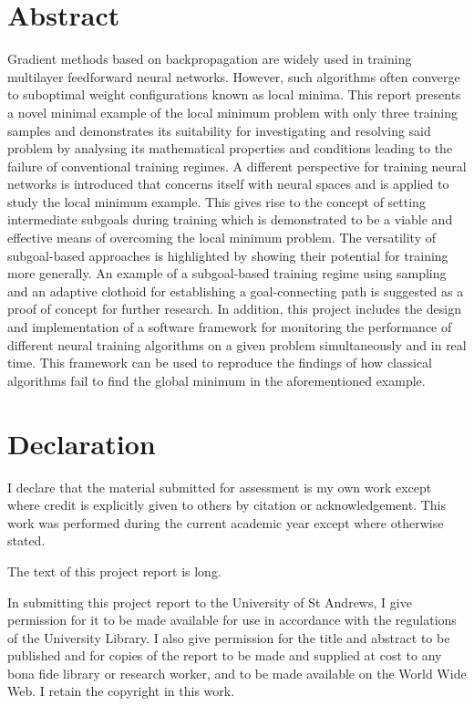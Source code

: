 \chapter*{Abstract}
Gradient methods based on backpropagation are widely used in training multilayer feedforward neural networks. 
However, such algorithms often converge to suboptimal weight configurations known as local minima. 
This report presents a novel minimal example of the local minimum problem with only three training samples and demonstrates its suitability for investigating and resolving said problem by analysing its mathematical properties and conditions leading to the failure of conventional training regimes. 
A different perspective for training neural networks is introduced that concerns itself with neural spaces and is applied to study the local minimum example.
This gives rise to the concept of setting intermediate subgoals during training which is demonstrated to be a viable and effective means of overcoming the local minimum problem. 
The versatility of subgoal-based approaches is highlighted by showing their potential for training more generally. 
An example of a subgoal-based training regime using sampling and an adaptive clothoid for establishing a goal-connecting path is suggested as a proof of concept for further research. 
In addition, this project includes the design and implementation of a software framework for monitoring the performance of different neural training algorithms on a given problem simultaneously and in real time. 
This framework can be used to reproduce the findings of how classical algorithms fail to find the global minimum in the aforementioned example.


\chapter*{Declaration}
I declare that the material submitted for assessment is my own work except where credit is explicitly given to others by citation or acknowledgement.
This work was performed during the current academic year except where otherwise stated.

The text of this project report is  long.

In submitting this project report to the University of St Andrews, I give permission for it to be made available for use in accordance with the regulations of the University Library. 
I also give permission for the title and abstract to be published and for copies of the report to be made and supplied at cost to any bona fide library or research worker, and to be made available on the World Wide Web.
I retain the copyright in this work.

